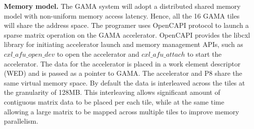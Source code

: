 \vspace{3pt}
\noindent
\textbf{Memory model.} 
The GAMA system will adopt a distributed shared memory model with non-uniform memory access latency. 
Hence, all the 16 GAMA tiles will share the address space. The programer uses OpenCAPI protocol to launch a sparse matrix operation on the GAMA accelerator. OpenCAPI provides  the libcxl library for initiating accelerator launch and memory management APIs, such as $cxl\_afu\_open\_dev$ to open the accelerator and $cxl\_afu\_attach$ to start the accelerator. The data for the accelerator is placed in a work element descriptor (WED) and is passed as a pointer to GAMA. The accelerator and P8 share the same virtual memory space. By default the data is interleaved across the tiles at the granularity of 128MB. This interleaving allows significant amount of contiguous matrix data to be placed per each tile, while at the same time allowing a large matrix to be mapped across multiple tiles to improve memory parallelism.   
 




